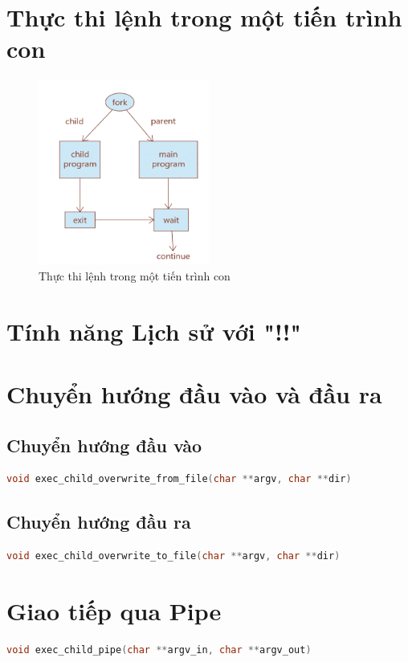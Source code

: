 \documentclass{article}
\begin{document}
\section{Thực thi lệnh trong một tiến trình con}

\begin{figure}[H]
\centering
\includegraphics[width=0.5\textwidth]{Executing Command in a Child Process.png}
\caption{Thực thi lệnh trong một tiến trình con}
\end{figure}

\section{Tính năng Lịch sử với "!!"}


\section{Chuyển hướng đầu vào và đầu ra}

\subsection{Chuyển hướng đầu vào}
\begin{lstlisting}[language=C]
void exec_child_overwrite_from_file(char **argv, char **dir)
\end{lstlisting}


\subsection{Chuyển hướng đầu ra}
\begin{lstlisting}[language=C]
void exec_child_overwrite_to_file(char **argv, char **dir)
\end{lstlisting}


\section{Giao tiếp qua Pipe}
\begin{lstlisting}[language=C]
void exec_child_pipe(char **argv_in, char **argv_out)
\end{lstlisting}
\end{document}
